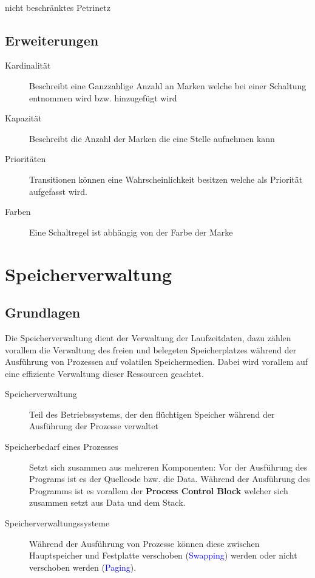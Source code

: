 \documentclass[10pt,a4paper]{article}
\begin{document}
\begin{multicols*}{4}
\begin{multicols*}{2}
	\hfill\\
	nicht beschränktes Petrinetz
\end{multicols*}
\endgroup
\subsection{Erweiterungen}
\begin{description}
	\item[Kardinalität] Beschreibt eine Ganzzahlige Anzahl an Marken welche bei einer Schaltung entnommen wird bzw.
	      hinzugefügt wird
	\item[Kapazität] Beschreibt die Anzahl der Marken die eine Stelle aufnehmen kann
	\item[Prioritäten] Transitionen können eine Wahrscheinlichkeit besitzen welche als Priorität aufgefasst wird.
	\item[Farben] Eine Schaltregel ist abhängig von der Farbe der Marke
\end{description}

\section{Speicherverwaltung}

\subsection{Grundlagen}
Die Speicherverwaltung dient der Verwaltung der Laufzeitdaten, dazu zählen vorallem die Verwaltung des freien und
belegeten Speicherplatzes während der Ausführung von Prozessen auf volatilen Speichermedien. Dabei wird vorallem auf
eine effiziente Verwaltung dieser Ressourcen geachtet.

\begin{description}
	\item[Speicherverwaltung] Teil des Betriebssystems, der den flüchtigen Speicher während der Ausführung der Prozesse
	      verwaltet
	\item[Speicherbedarf eines Prozesses] Setzt sich zusammen aus mehreren Komponenten: Vor der Ausführung des Programs
	      ist es der Quellcode bzw. die Data. Während der Ausführung des Programms ist es vorallem der
	      \textbf{Process Control Block} welcher sich zusammen setzt aus Data und dem Stack.
	\item[Speicherverwaltungssysteme] Während der Ausführung von Prozesse können diese zwischen Hauptspeicher und
	      Festplatte verschoben (\textcolor{blue}{Swapping}) werden oder nicht verschoben werden (\textcolor{blue}{Paging}).
\end{description}


\end{multicols*}
\end{document}
